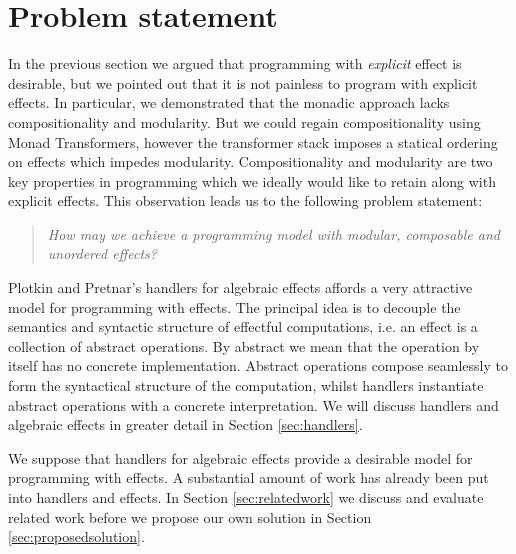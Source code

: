 \section{Problem statement}
In the previous section we argued that programming with \emph{explicit} effect is desirable, but we pointed out that it is not painless to program with explicit effects. In particular, we demonstrated that the monadic approach lacks compositionality and modularity. But we could regain compositionality using Monad Transformers, however the transformer stack imposes a statical ordering on effects which impedes modularity. Compositionality and modularity are two key properties in programming which we ideally would like to retain along with explicit effects. This observation leads us to the following problem statement:
\begin{quote}
  \emph{How may we achieve a programming model with modular, composable and unordered effects?}
\end{quote}
Plotkin and Pretnar's handlers for algebraic effects \cite{Plotkin2013} affords a very attractive model for programming with effects. The principal idea is to decouple the semantics and syntactic structure of effectful computations, i.e. an effect is a collection of abstract operations. By abstract we mean that the operation by itself has no concrete implementation. Abstract operations compose seamlessly to form the syntactical structure of the computation, whilst handlers instantiate abstract operations with a concrete interpretation. We will discuss handlers and algebraic effects in greater detail in Section \ref{sec:handlers}.

We suppose that handlers for algebraic effects provide a desirable model for programming with effects. A substantial amount of work has already been put into handlers and effects. In Section \ref{sec:relatedwork} we discuss and evaluate related work before we propose our own solution in Section \ref{sec:proposedsolution}.
